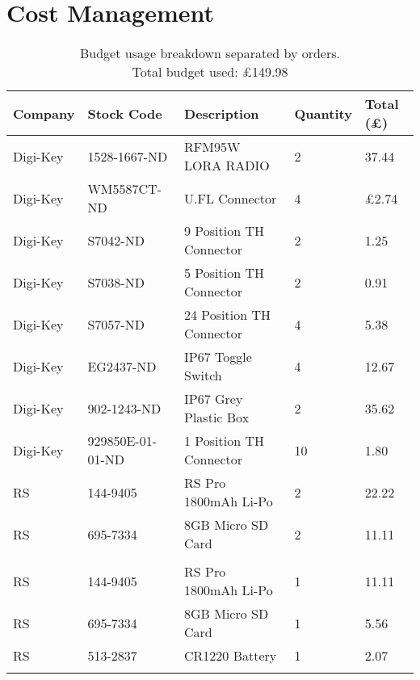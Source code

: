 \chapter{Cost Management}
\begin{table}[H]
\centering
\caption[Budget usage breakdown]{Budget usage breakdown separated by orders. \\ Total budget used: \pounds149.98}
\label{fig:budget_breakdown}
\begin{tabular}{p{2cm}|p{3.5cm}|p{5cm}|p{2cm}|p{2cm}}
\toprule
\textbf{Company} & \textbf{Stock Code} & \textbf{Description} & \textbf{Quantity} & \textbf{Total (\pounds)} \\
\midrule
Digi-Key & 1528-1667-ND & RFM95W LORA RADIO & 2 & 37.44 \\
Digi-Key & WM5587CT-ND &  U.FL Connector & 4 & £2.74 \\
\addlinespace\addlinespace
Digi-Key & S7042-ND & 9 Position TH Connector & 2 & 1.25 \\
Digi-Key & S7038-ND & 5 Position TH Connector & 2 & 0.91 \\
Digi-Key & S7057-ND & 24 Position TH Connector & 4 & 5.38 \\
Digi-Key & EG2437-ND & IP67 Toggle Switch & 4 & 12.67 \\
Digi-Key & 902-1243-ND & IP67 Grey Plastic Box & 2 & 35.62 \\
Digi-Key & 929850E-01-01-ND & 1 Position TH Connector & 10 & 1.80 \\
\addlinespace\addlinespace
RS & 144-9405 & RS Pro 1800mAh Li-Po & 2 & 22.22 \\
RS & 695-7334 & 8GB Micro SD Card & 2 & 11.11 \\
\addlinespace\addlinespace
\multicolumn{5}{l}{\textit{Spares Order}} \\
RS & 144-9405 & RS Pro 1800mAh Li-Po & 1 & 11.11 \\
RS & 695-7334 & 8GB Micro SD Card & 1 & 5.56 \\
RS & 513-2837 & CR1220 Battery	& 1 & 2.07 \\
\addlinespace\bottomrule
\end{tabular}
\end{table}


